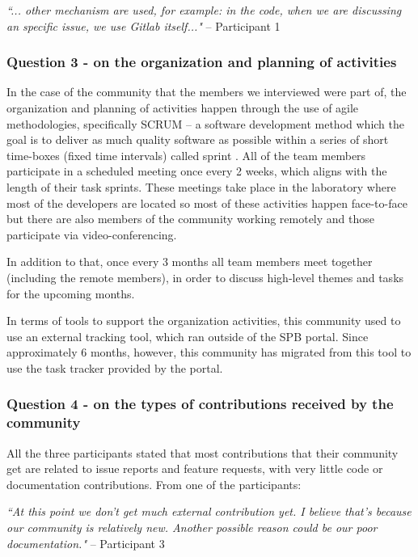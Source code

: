 \documentclass{sigchi}
\begin{document}
\begin{displayquote}
\textit{``... other mechanism are used, for example: in the code, when we are discussing an specific issue, we use Gitlab itself..."} – Participant 1
\end{displayquote}

\subsubsection{Question 3 - on the organization and planning of activities}
In the case of the community that the members we interviewed were part of, the organization and planning of activities happen through the use of agile methodologies, specifically SCRUM – a software development method which the goal is to deliver as much quality software as possible within a series of short time-boxes (fixed time intervals) called sprint \cite{Beedle1999}. All of the team members participate in a scheduled meeting once every 2 weeks, which aligns with the length of their task sprints. These meetings take place in the laboratory where most of the developers are located so most of these activities happen face-to-face but there are also members of the community working remotely and those participate via video-conferencing.

In addition to that, once every 3 months all team members meet together (including the remote members), in order to discuss high-level themes and tasks for the upcoming months.

In terms of tools to support the organization activities, this community used to use an external tracking tool, which ran outside of the SPB portal. Since approximately 6 months, however, this community has migrated from this tool to use the task tracker provided by the portal.

\subsubsection{Question 4 - on the types of contributions received by the community}

All the three participants stated that most contributions that their community get are related to issue reports and feature requests, with very little code or documentation contributions. From one of the participants:

\begin{displayquote}
\textit{``At this point we don't get much external contribution yet. I believe that's because our community is relatively new. Another possible reason could be our poor documentation."} – Participant 3
\end{displayquote}
\end{document}
